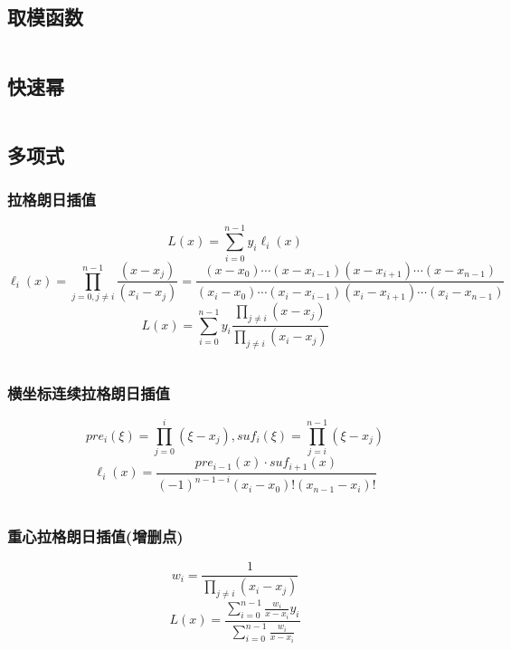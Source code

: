 \documentclass[utf8]{ctexart}
\newcommand{\cpp}[1]{\inputminted[linenos,breaklines,tabsize=4,mathescape]{c++}{#1}}
\begin{document}
\subsection{取模函数}
\cpp{codes/math/mod.cpp}

\subsection{快速幂}
\cpp{codes/math/power.cpp}


\subsection{多项式}

\subsubsection{拉格朗日插值}

$$L(x) = \sum_{i=0}^{n-1} y_i \ell_i(x)$$
$$\ell_i(x) = \prod_{j=0,j\ne i}^{n-1} \frac{(x - x_j)}{(x_i - x_j)} = \frac{(x - x_0) \cdots (x - x_{i-1})(x - x_{i+1}) \cdots (x - x_{n-1})}{(x_i - x_0) \cdots (x_i - x_{i-1})(x_i - x_{i+1}) \cdots (x_i - x_{n-1})}$$
$$L(x) = \sum_{i=0}^{n-1} y_i \frac{\prod \limits_{j \ne i} (x - x_j)}{\prod \limits_{j \ne i} (x_i - x_j)}$$

\cpp{codes/math/polynomial/lagrange.cpp}

\subsubsection{横坐标连续拉格朗日插值}

$$pre_i(\xi) = \prod_{j=0}^i (\xi - x_j), suf_i(\xi) = \prod_{j=i}^{n-1} (\xi - x_j)$$
$$\ell_i(x) = \frac{pre_{i-1}(x) \cdot suf_{i+1}(x)}{(-1)^{n-1-i}(x_i - x_0)! (x_{n-1} - x_i)!}$$

\cpp{codes/math/polynomial/lagrange-consecutive.cpp}

\subsubsection{重心拉格朗日插值(增删点)}

$$w_i = \frac{1}{\prod_{j \ne i}(x_i - x_j)}$$
$$L(x) = \frac{\sum_{i=0}^{n-1}\frac{w_i}{x-x_i}y_i}{\sum_{i=0}^{n-1}\frac{w_i}{x-x_i}}$$
\end{document}
